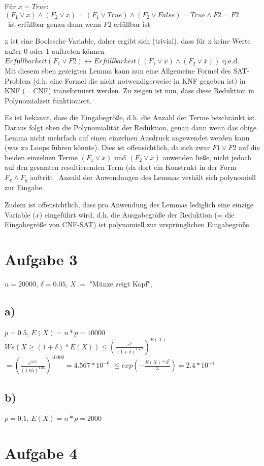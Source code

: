 \documentclass[a4paper,10pt,oneside,leqno]{scrartcl}
\begin{document}
Für $x = True$: $(F_1\vee x) \wedge (F_2 \vee \overline{x}) = (F_1\vee True) \wedge (F_2 \vee False) = True \wedge F2 = F2$\\
\textrightarrow\ ist erfüllbar genau dann wenn $F2$ erfüllbar ist

x ist eine Boolesche Variable, daher ergibt sich (trivial), dass für x keine Werte außer 0 oder 1 auftreten können \textrightarrow\ 
$Erfüllbarkeit(F_1\vee F2) \leftrightarrow Erfüllbarkeit((F_1\vee x) \wedge (F_2 \vee \overline{x}))$ q.e.d.\\[5mm]

Mit diesem eben gezeigten Lemma kann nun eine Allgemeine Formel des SAT-Problem (d.h. eine Formel die nicht notwendigerweise in KNF gegeben ist) in KNF (= CNF) transformiert werden. Zu zeigen ist nun, dass diese Reduktion in Polynomialzeit funktioniert.

Es ist bekannt, dass die Eingabegröße, d.h. die Anzahl der Terme beschränkt ist.
Daraus folgt eben die Polynomialität der Reduktion, genau dann wenn das obige Lemma nicht mehrfach auf einen einzelnen Ausdruck angewendet werden kann (was zu Loops führen könnte). Dies ist offensichtlich, da sich zwar $F1 \vee F2$ auf die beiden einzelnen Terme $(F_1\vee x)$ und $(F_2 \vee \overline{x})$ anwenden ließe, nicht jedoch auf den gesamten resultierenden Term (da dort ein Konstrukt in der Form $F_x \wedge F_y$ auftritt \textrightarrow\ Anzahl der Anwendungen des Lemmas verhält sich polynomiell zur Eingabe.

Zudem ist offensichtlich, dass pro Anwendung des Lemmas lediglich eine einzige Variable ($x$) eingeführt wird, d.h. die Ausgabegröße der Reduktion (= die Eingabegröße von CNF-SAT) ist polynomiell zur ursprünglichen Eingabegröße.

\section*{Aufgabe 3}%
$n=20000$, $\delta = 0.05$, $X :=$ "Münze zeigt Kopf",
\subsection*{a)}
$p = 0.5$, $E(X) = n*p = 10000$\newline
$Ws(X \geq (1+\delta) * E(X)) \leq (\frac{e^{\delta}}{(1+\delta)^{1+\delta}})^{E(X)}$\newline
$=(\frac{e^{0.05}}{(1.05)^{1.05}})^{10000} = 4.567*10^{-6}$\newline
$\leq exp(-\frac{E(X)*\delta^2}{3}) = 2.4*10^{-4}$

\subsection*{b)}
$p = 0.1$, $E(X) = n*p = 2000$

\section*{Aufgabe 4}%
\end{document}
